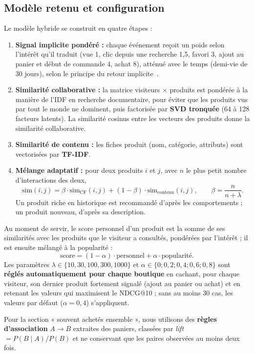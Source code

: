 \subsection{Modèle retenu et configuration}
Le modèle hybride se construit en quatre étapes :
\begin{enumerate}
  \item \textbf{Signal implicite pondéré :} chaque événement reçoit un poids selon l'intérêt qu'il traduit (vue 1, clic depuis une recherche 1,5, favori 3, ajout au panier et début de commande 4, achat 8), atténué avec le temps (demi-vie de 30 jours), selon le principe du retour implicite~\cite{Hu2008}.
  \item \textbf{Similarité collaborative :} la matrice visiteurs × produits est pondérée à la manière de l'IDF en recherche documentaire, pour éviter que les produits vus par tout le monde ne dominent, puis factorisée par \textbf{SVD tronquée} (64 à 128 facteurs latents). La similarité cosinus entre les vecteurs des produits donne la similarité collaborative.
  \item \textbf{Similarité de contenu :} les fiches produit (nom, catégorie, attributs) sont vectorisées par \textbf{TF-IDF}.
  \item \textbf{Mélange adaptatif :} pour deux produits $i$ et $j$, avec $n$ le plus petit nombre d'interactions des deux,
  \[ \text{sim}(i,j) = \beta \cdot \text{sim}_{\text{CF}}(i,j) + (1-\beta)\cdot \text{sim}_{\text{contenu}}(i,j), \qquad \beta = \frac{n}{n+\lambda}. \]
  Un produit riche en historique est recommandé d'après les comportements ; un produit nouveau, d'après sa description.
\end{enumerate}
Au moment de servir, le score personnel d'un produit est la somme de ses similarités avec les produits que le visiteur a consultés, pondérées par l'intérêt ; il est ensuite mélangé à la popularité :
\[ \text{score} = (1-\alpha)\cdot \text{personnel} + \alpha \cdot \text{popularité}. \]
Les paramètres $\lambda \in \{10, 30, 100, 300, 1000\}$ et $\alpha \in \{0; 0{,}2; 0{,}4; 0{,}6; 0{,}8\}$ sont \textbf{réglés automatiquement pour chaque boutique} en cachant, pour chaque visiteur, son dernier produit fortement signalé (ajout au panier ou achat) et en retenant les valeurs qui maximisent le NDCG@10 ; sans au moins 30 cas, les valeurs par défaut ($\alpha = 0{,}4$) s'appliquent.

Pour la section « souvent achetés ensemble », nous utilisons des \textbf{règles d'association} $A \rightarrow B$ extraites des paniers, classées par \textit{lift} $= P(B \mid A) / P(B)$ et ne conservant que les paires observées au moins deux fois.

